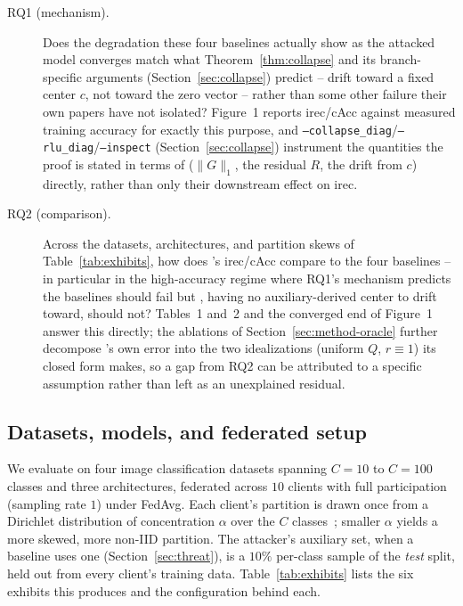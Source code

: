 \begin{description}
\item[RQ1 (mechanism).] Does the degradation these four baselines
actually show as the attacked model converges match what
Theorem~\ref{thm:collapse} and its branch-specific arguments
(Section~\ref{sec:collapse}) predict -- drift toward a fixed center $c$,
not toward the zero vector -- rather than some other failure their own
papers have not isolated? Figure~1 reports irec/cAcc against
measured training accuracy for exactly this purpose, and
\texttt{--collapse\_diag}/\texttt{--rlu\_diag}/\texttt{--inspect}
(Section~\ref{sec:collapse}) instrument the quantities the proof is
stated in terms of ($\|G\|_1$, the residual $R$, the drift from $c$)
directly, rather than only their downstream effect on irec.

\item[RQ2 (comparison).] Across the datasets, architectures, and
partition skews of Table~\ref{tab:exhibits}, how does \ourmethod{}'s
irec/cAcc compare to the four baselines -- in particular in the
high-accuracy regime where RQ1's mechanism predicts the baselines should
fail but \ourmethod{}, having no auxiliary-derived center to drift
toward, should not? Tables~1 and~2 and the converged end of Figure~1
answer this directly; the ablations of
Section~\ref{sec:method-oracle} further decompose \ourmethod{}'s own
error into the two idealizations (uniform $Q$, $r\equiv1$) its closed
form makes, so a gap from RQ2 can be attributed to a specific assumption
rather than left as an unexplained residual.
\end{description}

\subsection{Datasets, models, and federated setup}
\label{sec:eval-setup}

We evaluate on four image classification datasets spanning $C=10$ to
$C=100$ classes and three architectures, federated across $10$ clients
with full participation (sampling rate $1$) under FedAvg. Each client's
partition is drawn once from a Dirichlet distribution of concentration
$\alpha$ over the $C$ classes~\cite{hsu2019dirichlet}; smaller $\alpha$
yields a more skewed, more non-IID partition. The attacker's auxiliary
set, when a baseline uses one (Section~\ref{sec:threat}), is a $10\%$
per-class sample of the \emph{test} split, held out from every client's
training data. Table~\ref{tab:exhibits} lists the six exhibits this
produces and the configuration behind each.

